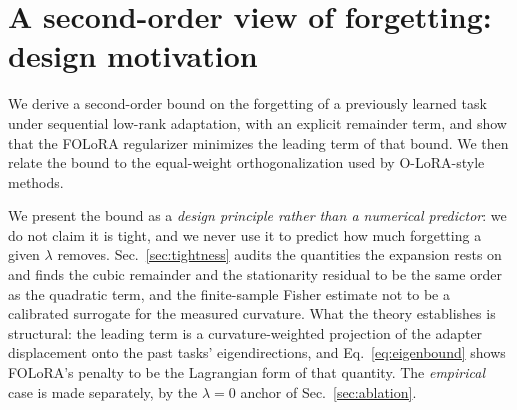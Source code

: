 \section{A second-order view of forgetting: design motivation}
\label{sec:theory}

We derive a second-order bound on the forgetting of a previously learned task under
sequential low-rank adaptation, with an explicit remainder term, and show that the
FOLoRA regularizer minimizes the leading term of that bound. We then relate the bound to
the equal-weight orthogonalization used by O-LoRA-style methods.

We present the bound as a \emph{design principle rather than a numerical predictor}: we do
not claim it is tight, and we never use it to predict how much forgetting a given $\lambda$
removes. Sec.~\ref{sec:tightness} audits the quantities the expansion rests on and finds the
cubic remainder and the stationarity residual to be the same order as the quadratic term,
and the finite-sample Fisher estimate not to be a calibrated surrogate for the measured
curvature. What the theory establishes is structural: the leading term is a
curvature-weighted projection of the adapter displacement onto the past tasks'
eigendirections, and Eq.~\eqref{eq:eigenbound} shows FOLoRA's penalty to be the Lagrangian
form of that quantity. The \emph{empirical} case is made separately, by the $\lambda{=}0$
anchor of Sec.~\ref{sec:ablation}.

